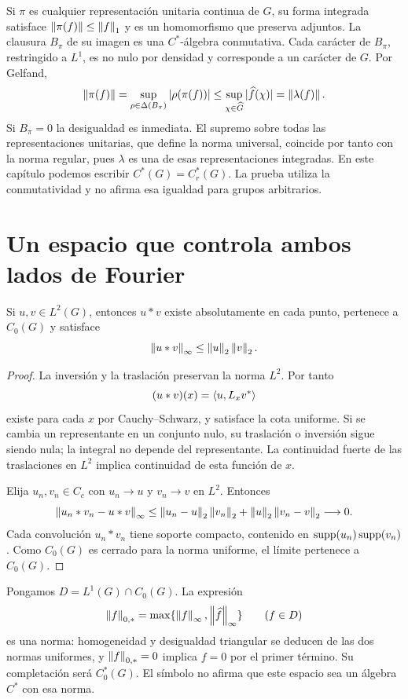 \begin{observacion}
Si $\pi$ es cualquier representación unitaria continua de $G$, su forma integrada satisface $\left\lVert\pi(f)\right\rVert\le\left\lVert f\right\rVert_1$ y es un homomorfismo que preserva adjuntos. La clausura $B_\pi$ de su imagen es una $C^*$-álgebra conmutativa. Cada carácter de $B_\pi$, restringido a $L^1$, es no nulo por densidad y corresponde a un carácter de $G$. Por Gelfand,
\[
 \left\lVert\pi(f)\right\rVert
 =\sup_{\rho\in\Delta(B_\pi)}|\rho(\pi(f))|
 \le\sup_{\chi\in\widehat G}|\widehat f(\chi)|
 =\left\lVert\lambda(f)\right\rVert.
\]
Si $B_\pi=0$ la desigualdad es inmediata. El supremo sobre todas las representaciones unitarias, que define la norma universal, coincide por tanto con la norma regular, pues $\lambda$ es una de esas representaciones integradas. En este capítulo podemos escribir $C^*(G)=C_r^*(G)$. La prueba utiliza la conmutatividad y no afirma esa igualdad para grupos arbitrarios.
\end{observacion}

\section{Un espacio que controla ambos lados de Fourier}\label{lectura:v4-28}
\begin{lema}\label{v4:l2-convolucion-cero}
Si $u,v\in L^2(G)$, entonces $u*v$ existe absolutamente en cada punto, pertenece a $C_0(G)$ y satisface
\[
 \left\lVert u*v\right\rVert_\infty\le\left\lVert u\right\rVert_2\left\lVert v\right\rVert_2.
\]
\end{lema}
\begin{proof}
La inversión y la traslación preservan la norma $L^2$. Por tanto
\[
 (u*v)(x)=\left\langle u,L_xv^*\right\rangle
\]
existe para cada $x$ por Cauchy--Schwarz, y satisface la cota uniforme. Si se cambia un representante en un conjunto nulo, su traslación o inversión sigue siendo nula; la integral no depende del representante. La continuidad fuerte de las traslaciones en $L^2$ implica continuidad de esta función de $x$.

Elija $u_n,v_n\in C_c$ con $u_n\to u$ y $v_n\to v$ en $L^2$. Entonces
\[
 \left\lVert u_n*v_n-u*v\right\rVert_\infty
 \le\left\lVert u_n-u\right\rVert_2\left\lVert v_n\right\rVert_2
       +\left\lVert u\right\rVert_2\left\lVert v_n-v\right\rVert_2\longrightarrow0.
\]
Cada convolución $u_n*v_n$ tiene soporte compacto, contenido en $\operatorname{supp}(u_n)\operatorname{supp}(v_n)$. Como $C_0(G)$ es cerrado para la norma uniforme, el límite pertenece a $C_0(G)$.
\end{proof}

Pongamos $D=L^1(G)\cap C_0(G)$. La expresión
\[
 \left\lVert f\right\rVert_{0,*}=\max\{\left\lVert f\right\rVert_\infty,\left\lVert\widehat f\right\rVert_\infty\}
 \qquad(f\in D)
\]
es una norma: homogeneidad y desigualdad triangular se deducen de las dos normas uniformes, y $\left\lVert f\right\rVert_{0,*}=0$ implica $f=0$ por el primer término. Su completación será $C_0^*(G)$. El símbolo no afirma que este espacio sea un álgebra $C^*$ con esa norma.

